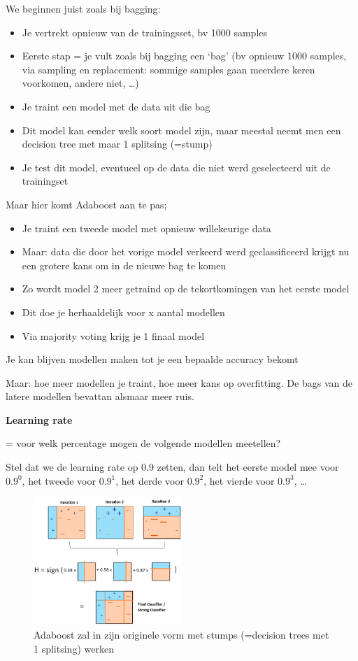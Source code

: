 \documentclass{article}
\begin{document}
We beginnen juist zoals bij bagging:

\begin{itemize}
    \item Je vertrekt opnieuw van de trainingsset, bv 1000 samples
    \item Eerste stap = je vult zoals bij bagging een `bag' (bv opnieuw 1000 samples, via sampling en replacement: sommige samples gaan meerdere keren voorkomen, andere niet, \dots)
    \item Je traint een model met de data uit die bag
    \item Dit model kan eender welk soort model zijn, maar meestal neemt men een decision tree met maar 1 splitsing (=stump)
    \item Je test dit model, eventueel op de data die niet werd geselecteerd uit de trainingset
\end{itemize}

Maar hier komt Adaboost aan te pas;

\begin{itemize}
    \item Je traint een tweede model met opnieuw willekeurige data
    \item Maar: data die door het vorige model verkeerd werd geclassificeerd krijgt nu een grotere kans om in de nieuwe bag te komen
    \item Zo wordt model 2 meer getraind op de tekortkomingen van het eerste model 
    \item Dit doe je herhaaldelijk voor x aantal modellen
    \item Via majority voting krijg je 1 finaal model
\end{itemize}

Je kan blijven modellen maken tot je een bepaalde accuracy bekomt

Maar: hoe meer modellen je traint, hoe meer kans op overfitting. De bags van de latere modellen bevattan alsmaar meer ruis.

\textbf{Learning rate}

= voor welk percentage mogen de volgende modellen meetellen?

Stel dat we de learning rate op 0.9 zetten, dan telt het eerste model mee voor $0.9^0$, 
het tweede voor $0.9^1$, het derde voor $0.9^2$, het vierde voor $0.9^3$, \dots


\begin{figure}[H]
    \centering
    \includegraphics[width=0.5\textwidth]{adaboost2.png}
    \caption{Adaboost zal in zijn originele vorm met stumps (=decision trees met 1 splitsing) werken}
\end{figure}
\end{document}

